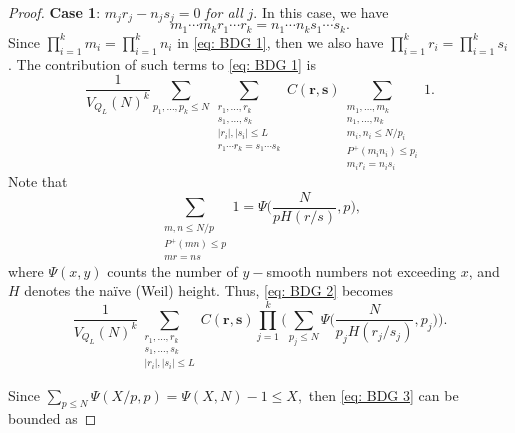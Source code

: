 \documentclass[12pt]{amsart}
\renewcommand{\le}{\leqslant}
\renewcommand{\leq}{\leqslant}
\numberwithin{equation}{section}
\theoremstyle{plain}
\theoremstyle{definition}
\begin{document}
\begin{proof}
		\textbf{Case 1}: $m_jr_j-n_js_j = 0 $ \textit{for all} $j$. In this case, we have 
		$$m_1 \cdots m_k r_1 \cdots r_k = n_1 \cdots n_k s_1 \cdots s_k.$$
		Since $\prod_{i = 1}^k m _i = \prod_{i = 1}^k n_i$ in \eqref{eq: BDG 1}, then we also have $\prod_{i = 1}^k r_i = \prod_{i = 1}^k s_i$. The contribution of such terms to \eqref{eq: BDG 1} is
		\begin{equation}\label{eq: BDG 2}
			\frac{1}{V_{Q_L}(N)^k}\sum_{p_1,\dots ,p_k \leq N}\sum_{\substack{r_1,\dots ,r_k \\ s_1,\dots ,s_k \\ |r_i|,|s_i| \leq L \\ r_1 \cdots r_k = s_1 \cdots s_k}}C(\bm{r,s})\sum_{\substack{m_1,\dots, m_k\\ n_1,\dots ,n_k\\ m_i,n_i \leq N/p_i\\ P^+(m_in_i) \leq p_i\\ m_ir_i=n_is_i}} 1.
		\end{equation}
		Note that 
		$$\sum_{\substack{m,n \leq N/p\\ P^+(mn) \leq p\\ mr=ns}} 1 = \Psi\bigg(\frac{N}{p H(r/s)},p\bigg),$$
		where $\Psi(x,y)$ counts the number of $y-$smooth numbers not exceeding $x$, and $H$ denotes the na\"ive (Weil) height. Thus, \eqref{eq: BDG 2} becomes
		\begin{equation}\label{eq: BDG 3}
			\frac{1}{V_{Q_L}(N)^k}\sum_{\substack{r_1,\dots ,r_k \\ s_1,\dots ,s_k \\ |r_i|,|s_i| \leq L}}C(\bm{r,s}) \prod_{j = 1}^k  \bigg(\sum_{p_j \leq N}\Psi\Big(\frac{N}{p_j H(r_j/s_j)},p_j\Big)\bigg).
		\end{equation}
		
		Since $\sum_{p \leq N}\Psi(X/p,p) = \Psi(X,N) -1 \le X,$ then \eqref{eq: BDG 3} can be bounded as
		

\end{proof}
\end{document}
